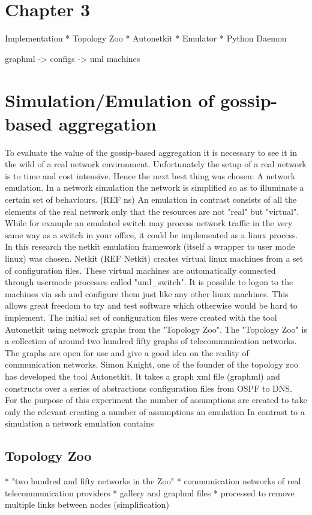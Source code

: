 \documentclass[11pt,a4paper]{article}
\begin{document}
\newpage

\section{Chapter 3}
Implementation
* Topology Zoo
* Autonetkit
* Emulator
* Python Daemon

graphml -> configs -> uml machines
\section{Simulation/Emulation of gossip-based aggregation}
To evaluate the value of the gossip-based aggregation it is necessary to see it in the wild of a real network environment. Unfortunately the setup of a real network is to time and cost intensive. Hence the next best thing was chosen: A network emulation. In a network simulation the network is simplified so as to illuminate a certain set of behaviours. (REF ns) An emulation in contrast consists of all the elements of the real network only that the resources are not "real" but "virtual". While for example an emulated switch may process network traffic in the very same way as a switch in your office, it could be implemented as a linux process.
In this research the netkit emulation framework (itself a wrapper to user mode linux) was chosen. Netkit (REF Netkit) creates virtual linux machines from a set of configuration files. These virtual machines are automatically connected through usermode processes called "uml\_switch". It is possible to logon to the machines via ssh and configure them just like any other linux machines. This allows great freedom to try and test software which otherwise would be hard to implement.
The initial set of configuration files were created with the tool Autonetkit using network graphs from the "Topology Zoo". The "Topology Zoo" is a collection of around two hundred fifty graphs of telecommunication networks. The graphs are open for use and give a good idea on the reality of communication networks. Simon Knight, one of the founder of the topology zoo has developed the tool Autonetkit. It takes a graph xml file (graphml) and constructs over a series of abstractions configuration files from OSPF to DNS.
For the purpose of this experiment the
number of assumptions are created to take only the relevant creating a number of assumptions an emulation In contrast to a simulation a network emulation contains
\subsection{Topology Zoo}
* "two hundred and fifty networks in the Zoo"
* communication networks of real telecommunication providers
* gallery and graphml files
* processed to remove multiple links between nodes (simplification)
\end{document}
